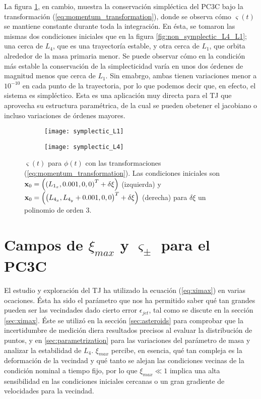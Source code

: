 La figura \ref{fig:symplectic_L4_L1}, en cambio, muestra la conservación simpléctica del PC3C bajo la transformación (\ref{eq:momentum_transformation}), donde se observa cómo $\varsigma(t)$ se mantiene constante durante toda la integración. En ésta, se tomaron las mismas dos condiciones iniciales que en la figura \ref{fig:non_symplectic_L4_L1}; una cerca de $L_4$, que es una trayectoría estable, y otra cerca de $L_1$, que orbita alrededor de la masa primaria menor. Se puede observar cómo en la condición más estable la conservación de la simplecticidad varía en unos dos órdenes de magnitud menos que cerca de $L_1$. Sin emabrgo, ambas tienen variaciones menor a $10^{-10}$ en cada punto de la trayectoria, por lo que podemos decir que, en efecto, el sistema es simpléctico. Esta es una aplicación muy directa para el TJ que aprovecha su estructura paramétrica, de la cual se pueden obetener el jacobiano o incluso variaciones de órdenes mayores. 

\begin{figure}[h!]
\centering
\begin{subfigure}{0.49\textwidth}
	\centering
	\texttt{[image: symplectic\_L1]}
\end{subfigure}
%
\begin{subfigure}{0.49\textwidth}
	\centering
	\texttt{[image: symplectic\_L4]}
\end{subfigure}
\caption{$\varsigma(t)$ para $\phi(t)$ con las transformaciones (\ref{eq:momentum_transformation}). Las condiciones iniciales son $\mathbf{x}_0 = \left( \left( L_{1_x}, 0.001, 0, 0 \right)^T + \delta \xi \right) $ (izquierda) y $ \mathbf{x}_0 = \left( \left( L_{4_x}, L_{4_y} + 0.001, 0, 0 \right)^T + \delta \xi \right) $ (derecha) para $\delta \xi$ un polinomio de orden $3$.}
\label{fig:symplectic_L4_L1}
\end{figure}


\section{Campos de $\xi_{max}$ y $\varsigma_\pm$ para el PC3C}
\label{sec:C3BP_heatmaps}

El estudio y exploración del TJ ha utilizado la ecuación (\ref{eq:ximax}) en varias ocaciones. Ésta ha sido el parámetro que nos ha permitido saber qué tan grandes pueden ser las vecindades dado cierto error $\epsilon_{jet}$, tal como se discute en la sección \ref{sec:ximax}. Éste se utilizó en la sección \ref{sec:asteroids} para comprobar que la incertidumbre de medición diera resultados precisos al evaluar la distribución de puntos, y en \ref{sec:parametrization} para las variaciones del parámetro de masa y analizar la estabilidad de $L_4$. $\xi_{max}$ percibe, en esencia, qué tan compleja es la deformación de la vecindad y qué tanto se alejan las condiciones vecinas de la condición nominal a tiempo fijo, por lo que $\xi_{max} \ll 1$ implica una alta sensibilidad en las condiciones iniciales cercanas o un gran gradiente de velocidades para la vecindad. 


